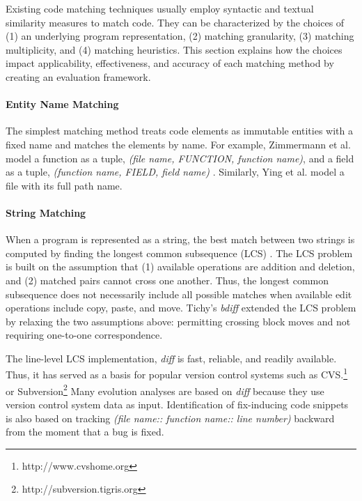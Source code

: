 \documentclass[runningheads,a4paper]{llncs}
\begin{document}
Existing code matching techniques usually employ syntactic and textual similarity measures to match code. They can be characterized by the choices of (1) an underlying program representation, (2) matching granularity, (3) matching multiplicity, and (4) matching heuristics. This section explains how the choices impact applicability, effectiveness, and accuracy of each matching method by creating an evaluation framework. 


\paragraph{Entity Name Matching}
The simplest matching method treats code elements as immutable entities with a fixed name and matches the elements by name. For example, Zimmermann et al. model a function as a tuple, \textit{(file name, FUNCTION, function name)}, and a field as a tuple, \textit{(function name, FIELD, field name)} \cite{Zimmermann2004}. Similarly, Ying et al. \cite{Ying2004} model a file with its full path name. %

\paragraph{String Matching}
When a program is represented as a string, the best match between two strings is computed by finding the longest common subsequence (LCS) \cite{Apostolico1997}. The LCS problem is built on the assumption that (1) available operations are addition and deletion, and (2) matched pairs cannot cross one another. Thus, the longest common subsequence does not necessarily include all possible matches when available edit operations include copy, paste, and move. Tichy's \textit{bdiff} \cite{Tichy1984} extended the LCS problem by relaxing the two assumptions above: permitting crossing block moves and not requiring one-to-one correspondence. 

The line-level LCS implementation, \textit{diff} \cite{Hunt1977} is fast, reliable, and readily available. Thus, it has served as a basis for popular version control systems such as CVS.\footnote{http://www.cvshome.org} or Subversion\footnote{http://subversion.tigris.org} Many evolution analyses are based on {\it diff} because they use version control system data as input. Identification of fix-inducing code snippets \cite{Sliwerski2005} is also based on tracking \textit{(file name:: function name:: line number)} backward from the moment that a bug is fixed.  
\end{document}
